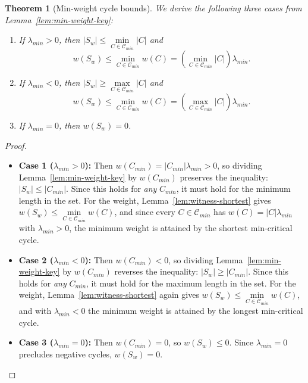 \documentclass{article}
\newtheorem{thm}{Theorem}[section]
\theoremstyle{definition}
\begin{document}
\begin{thm}[Min-weight cycle bounds]
  \label{thm:min-weight}
  We derive the following three cases from
  Lemma~\ref{lem:min-weight-key}:
  \begin{enumerate}
  \item If $\lambda_{min} > 0$, then
    $|S_w| \leq \min\limits_{C \in \mathcal{C}_{min}} |C|$
    and
    \begin{equation*}
      w(S_w) \leq \min\limits_{C \in \mathcal{C}_{min}} w(C)
      = (\min\limits_{C \in \mathcal{C}_{min}} |C|) \lambda_{min}.
    \end{equation*}
  \item If $\lambda_{min} < 0$, then
    $|S_w| \geq \max\limits_{C \in \mathcal{C}_{min}} |C|$
    and
    \begin{equation*}
      w(S_w) \leq \min\limits_{C \in \mathcal{C}_{min}} w(C)
      = (\max\limits_{C \in \mathcal{C}_{min}} |C|) \lambda_{min}.
    \end{equation*}
  \item If $\lambda_{min} = 0$, then $w(S_w) = 0$.
\end{enumerate}
\end{thm}

\begin{proof}
\mbox{}\par
\begin{itemize}
    \item \textbf{Case 1 ($\lambda_{min} > 0$):} Then $w(C_{min}) =
      |C_{min}|\lambda_{min} > 0$, so dividing
      Lemma~\ref{lem:min-weight-key} by $w(C_{min})$ preserves the
      inequality: $|S_w| \leq |C_{min}|$. Since this holds for
      \textit{any} $C_{min}$, it must hold for the minimum length in
      the set. For the weight, Lemma~\ref{lem:witness-shortest} gives
      $w(S_w) \leq \min\limits_{C \in \mathcal{C}_{min}} w(C)$, and
      since every $C \in \mathcal{C}_{min}$ has $w(C) =
      |C|\lambda_{min}$ with $\lambda_{min} > 0$, the minimum weight is
      attained by the shortest min-critical cycle.
    \item \textbf{Case 2 ($\lambda_{min} < 0$):} Then $w(C_{min}) <
      0$, so dividing Lemma~\ref{lem:min-weight-key} by $w(C_{min})$
      reverses the inequality: $|S_w| \geq |C_{min}|$. Since this
      holds for \textit{any} $C_{min}$, it must hold for the maximum
      length in the set. For the weight,
      Lemma~\ref{lem:witness-shortest} again gives $w(S_w) \leq
      \min\limits_{C \in \mathcal{C}_{min}} w(C)$, and with
      $\lambda_{min} < 0$ the minimum weight is attained by the
      longest min-critical cycle.
    \item \textbf{Case 3 ($\lambda_{min} = 0$):} Then $w(C_{min}) =
      0$, so $w(S_w) \leq 0$. Since $\lambda_{min} = 0$ precludes
      negative cycles, $w(S_w) = 0$.
\end{itemize}
\end{proof}
\end{document}
